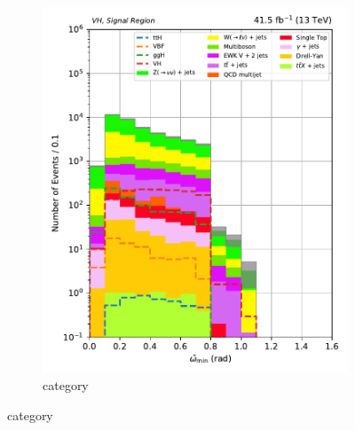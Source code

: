 \begin{figure}[htbp]
\begin{subfigure}[b]{0.35\textwidth}
        \includegraphics[width=\textwidth]{figures/category_optimisations/with_mindphi_cut/min_omega_tilde_VH.pdf}
        \caption{\VH category}
    \end{subfigure}


\end{figure}

